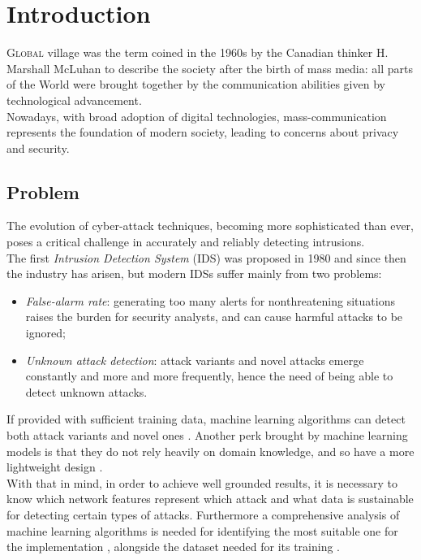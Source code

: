 \chapter{Introduction}
\label{chap:intro}

\lettrine[lines=3, findent=3pt, nindent=0pt]{G}{lobal} village was the term coined in the 1960s by the Canadian thinker H. Marshall McLuhan \cite{mcluhan1962} to describe the society after the birth of mass media: all parts of the World were brought together by the communication abilities given by technological advancement. \\
Nowadays, with broad adoption of digital technologies, mass-communication represents the foundation of modern society, leading to concerns about privacy and security.




\section{Problem}
\label{sec:problem}

The evolution of cyber-attack techniques, becoming more sophisticated than ever, poses a critical challenge in accurately and reliably detecting intrusions.\\ The first \textit{Intrusion Detection System} (IDS) was proposed in 1980 \cite{Andreson1980} and since then the industry has arisen, but modern IDSs suffer mainly from two problems:
\begin{itemize}
    \item[\faCaretRight] \textit{False-alarm rate}: generating too many alerts for nonthreatening situations raises the burden for security analysts, and can cause harmful attacks to be ignored;
    \item[\faCaretRight] \textit{Unknown attack detection}: attack variants and novel attacks emerge constantly and more and more frequently, hence the need of being able to detect unknown attacks.
\end{itemize}
If provided with sufficient training data, machine learning algorithms can detect both attack variants and novel ones \cite{Hodo2017}. Another perk brought by machine learning models is that they do not rely heavily on domain knowledge, and so have a more lightweight design \cite{Khraisat2019}. \\ With that in mind, in order to achieve well grounded results, it is necessary to know which network features represent which attack \cite{Iglesias2015} and what data is sustainable for detecting certain types of attacks. Furthermore a comprehensive analysis of machine learning algorithms is needed for identifying the most suitable one for the implementation \cite{Liu2019}, alongside the dataset needed for its training \cite{Sharafaldin2019}.



